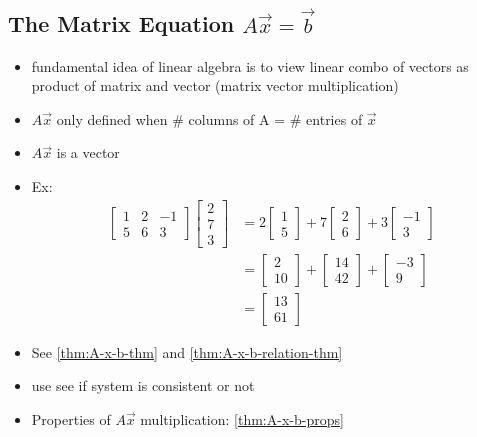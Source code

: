 \documentclass[a4paper,12pt]{article}
\theoremstyle{definition}
\theoremstyle{definition}
\begin{document}
	\subsection{The Matrix Equation $A\vec{x} = \vec{b}$}
	\begin{itemize}
		\item fundamental idea of linear algebra is to view linear combo of vectors as product of matrix and vector (matrix vector multiplication)
		
		\item $A\vec{x}$ only defined when \# columns of A = \# entries of $\vec{x}$
		
		\item $A\vec{x}$ is a vector
		
		\item Ex:
		\begin{align*}
			\begin{bmatrix}
				1 & 2 & -1\\
				5 & 6 & 3
			\end{bmatrix}
			\begin{bmatrix}
				2\\
				7\\
				3
			\end{bmatrix}&=
			2
			\begin{bmatrix}
				1\\
				5
			\end{bmatrix}
			+ 7
			\begin{bmatrix}
				2\\
				6
			\end{bmatrix}
			+ 3
			\begin{bmatrix}
				-1\\
				3
			\end{bmatrix}\\
			&=
			\begin{bmatrix}
				2\\
				10
			\end{bmatrix}
			+
			\begin{bmatrix}
				14\\
				42
			\end{bmatrix}
			+
			\begin{bmatrix}
				-3\\
				9
			\end{bmatrix}\\
			&=
			\begin{bmatrix}
				13\\
				61
			\end{bmatrix}
		\end{align*}
		
		\item See \autoref{thm:A-x-b-thm} and \autoref{thm:A-x-b-relation-thm}
		
		\item use  see if system is consistent or not
		
		\item Properties of $A\vec{x}$ multiplication: \autoref{thm:A-x-b-props}
	\end{itemize}
	
\end{document}
